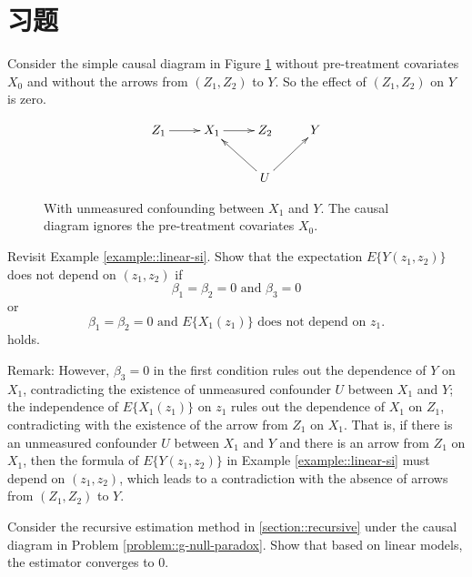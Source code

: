 \section{习题}\label{sec:29-homework}

\begin{HomeworkProblem}\label{exr:29-1}


Consider the simple causal diagram in Figure \ref{fig::si-g-null-paradox} without pre-treatment covariates $X_0$ and without the arrows from $(Z_1, Z_2)$ to $Y$. So the effect of $(Z_1,Z_2)$ on $Y$ is zero.

\begin{figure}
\bigskip
\[
 \xymatrix{
 Z_1 \ar[r]   & X_1   \ar[r]  & Z_2  & Y \\
                                             &                                             &U\ar[lu]\ar[ru]
 }
 \]
 \caption{With unmeasured confounding between $X_1$ and $Y$. The causal diagram ignores the pre-treatment covariates $X_0$.}\label{fig::si-g-null-paradox}
\end{figure}


Revisit Example \ref{example::linear-si}. Show that the expectation $E\{ Y(z_1, z_2) \} $ does not depend on $(z_1, z_2)$ if
\[
\beta_1  = \beta_2 = 0  \text{ and }   \beta_3 = 0
\]
or
\[
\beta_1 = \beta_2 = 0 \text{ and } E\{ X_1(z_1)\}  \text{ does not depend on } z_1.
\]
holds.


Remark:
However, $\beta_3 = 0$ in the first condition rules out the dependence of $Y$ on $X_1$, contradicting the existence of unmeasured confounder $U$ between $X_1$ and $Y$; the independence of $E\{ X_1(z_1)\} $ on $z_1$ rules out the dependence of $X_1$ on $Z_1$, contradicting with the existence of the arrow from $Z_1$ on $X_1$. That is, if there is an unmeasured confounder $U$ between $X_1$ and $Y$ and there is an arrow from $Z_1$ on $X_1$, then the formula of $E\{ Y(z_1, z_2) \} $ in Example \ref{example::linear-si} must depend on $(z_1, z_2)$, which leads to a contradiction with the absence of arrows from $(Z_1, Z_2)$ to $Y$.


\end{HomeworkProblem}

\begin{HomeworkProblem}\label{exr:29-2}


Consider the recursive estimation method in \ref{section::recursive} under the causal diagram in Problem \ref{problem::g-null-paradox}.
Show that based on linear models, the estimator converges to 0.



\end{HomeworkProblem}

